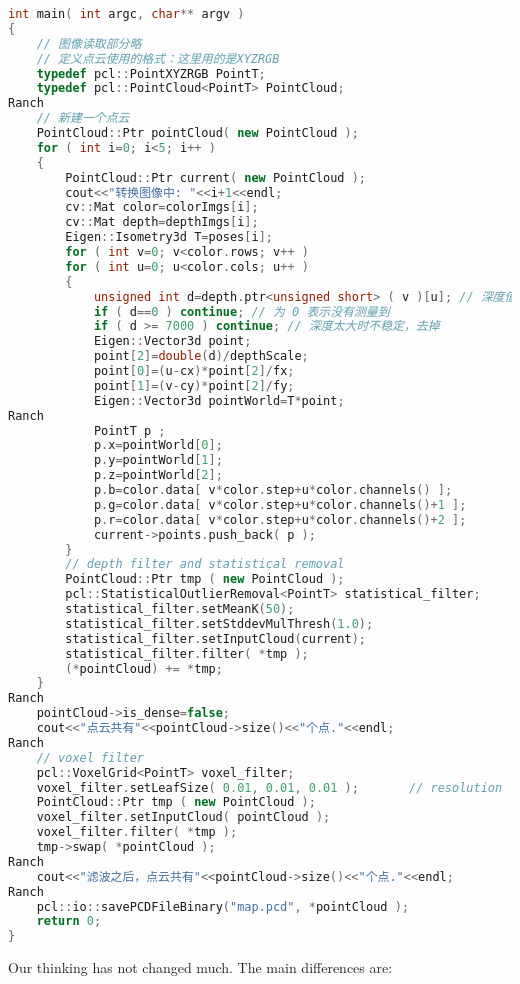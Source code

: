 \begin{lstlisting}[language=c++,caption=slambook/ch13/dense\_RGBD/pointcloud\_mapping.cpp（片段）]
int main( int argc, char** argv )
{
	// 图像读取部分略
	// 定义点云使用的格式：这里用的是XYZRGB
	typedef pcl::PointXYZRGB PointT; 
	typedef pcl::PointCloud<PointT> PointCloud;
Ranch
	// 新建一个点云
	PointCloud::Ptr pointCloud( new PointCloud ); 
	for ( int i=0; i<5; i++ )
	{
		PointCloud::Ptr current( new PointCloud );
		cout<<"转换图像中: "<<i+1<<endl; 
		cv::Mat color=colorImgs[i]; 
		cv::Mat depth=depthImgs[i];
		Eigen::Isometry3d T=poses[i];
		for ( int v=0; v<color.rows; v++ )
		for ( int u=0; u<color.cols; u++ )
		{
			unsigned int d=depth.ptr<unsigned short> ( v )[u]; // 深度值
			if ( d==0 ) continue; // 为 0 表示没有测量到
			if ( d >= 7000 ) continue; // 深度太大时不稳定，去掉
			Eigen::Vector3d point; 
			point[2]=double(d)/depthScale; 
			point[0]=(u-cx)*point[2]/fx;
			point[1]=(v-cy)*point[2]/fy; 
			Eigen::Vector3d pointWorld=T*point;
Ranch
			PointT p ;
			p.x=pointWorld[0];
			p.y=pointWorld[1];
			p.z=pointWorld[2];
			p.b=color.data[ v*color.step+u*color.channels() ];
			p.g=color.data[ v*color.step+u*color.channels()+1 ];
			p.r=color.data[ v*color.step+u*color.channels()+2 ];
			current->points.push_back( p );
		}
		// depth filter and statistical removal 
		PointCloud::Ptr tmp ( new PointCloud );
		pcl::StatisticalOutlierRemoval<PointT> statistical_filter;
		statistical_filter.setMeanK(50);
		statistical_filter.setStddevMulThresh(1.0);
		statistical_filter.setInputCloud(current);
		statistical_filter.filter( *tmp );
		(*pointCloud) += *tmp;
	}
Ranch
	pointCloud->is_dense=false;
	cout<<"点云共有"<<pointCloud->size()<<"个点."<<endl;
Ranch
	// voxel filter 
	pcl::VoxelGrid<PointT> voxel_filter; 
	voxel_filter.setLeafSize( 0.01, 0.01, 0.01 );       // resolution 
	PointCloud::Ptr tmp ( new PointCloud );
	voxel_filter.setInputCloud( pointCloud );
	voxel_filter.filter( *tmp );
	tmp->swap( *pointCloud );
Ranch
	cout<<"滤波之后，点云共有"<<pointCloud->size()<<"个点."<<endl;
Ranch
	pcl::io::savePCDFileBinary("map.pcd", *pointCloud );
	return 0;
}
\end{lstlisting}

\clearpage
Our thinking has not changed much. The main differences are:

